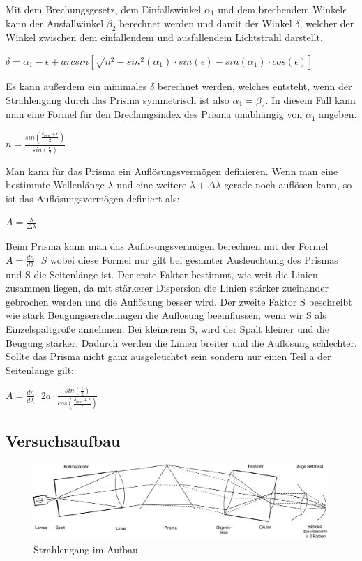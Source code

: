 \documentclass[a4paper, 11pt]{article}
\begin{document}
Mit dem Brechungsgesetz, dem Einfallswinkel $\alpha_1$ und dem brechendem Winkel$\epsilon $ kann der Ausfallwinkel $\beta_2$ berechnet werden und damit der Winkel $\delta$, welcher der Winkel zwischen dem einfallendem und ausfallendem Lichtstrahl darstellt.
\begin{center}
$\delta = \alpha_1 -\epsilon +arcsin[\sqrt{n^2-sin^2 (\alpha_1 )} \cdot sin(\epsilon ) -sin(\alpha_1 )\cdot cos(\epsilon )] $
\end{center}

Es kann außerdem ein minimales $\delta$ berechnet werden, welches entsteht, wenn der Strahlengang durch das Prisma symmetrisch ist also $\alpha_1=\beta_2$. In diesem Fall kann man eine Formel für den Brechungsindex des Prisma unabhängig von $\alpha_1$ angeben.
\begin{center}
$n=\frac{sin(\frac{\delta_{min}+\epsilon}{2})}{sin(\frac{\epsilon}{2})}$
\end{center}
Man kann für das Prisma ein Auflösungsvermögen definieren. Wenn man eine bestimmte Wellenlänge $\lambda $ und eine weitere $\lambda + \Delta \lambda$ gerade noch auflösen kann, so ist das Auflösungsvermögen definiert als:
\begin{center}
$A=\frac{\lambda}{\Delta \lambda}$
\end{center}
Beim Prisma kann man das Auflösungsvermögen berechnen mit der Formel $A=\frac{dn}{d\lambda}\cdot S $ wobei diese Formel nur gilt bei gesamter Ausleuchtung des Prismas und S die Seitenlänge ist.
Der erste Faktor bestimmt, wie weit die Linien zusammen liegen, da mit stärkerer Dispersion die Linien stärker zueinander gebrochen werden und die Auflösung besser wird. Der zweite Faktor S beschreibt wie stark Beugungserscheinugen die Auflösung beeinflussen, wenn wir S als Einzelspaltgröße annehmen. Bei kleinerem S, wird der Spalt kleiner und die Beugung stärker. Dadurch werden die Linien breiter und die Auflösung schlechter.
Sollte das Prisma nicht ganz ausgeleuchtet sein sondern nur einen Teil a der Seitenlänge gilt:
\begin{center}
$A=\frac{dn}{d\lambda}\cdot 2a \cdot \frac{sin(\frac{\epsilon}{2})}{cos(\frac{\delta_{min}+\epsilon}{2})}$ 
\end{center}

\subsection{Versuchsaufbau}\label{Aufbau}

\begin{figure}[H]
	\centering
	\includegraphics[trim = 0mm 0mm 0mm 0mm,clip, width=12cm]{Bilder/Aufbaugezeichnet.png}%
	\caption[Strahlengang im Aufbau]{Strahlengang im Aufbau}%
	\label{pic:Abbildung 1}%
\end{figure}
\end{document}
